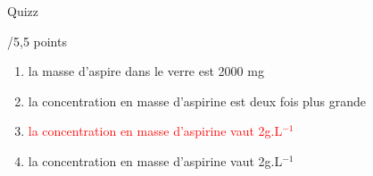 \begin{doc}{Quizz \begin{large}
    /5,5 points
\end{large}}
\begin{enumerate}
\begin{enumerate}[label=\textit{\alph*.}, align=left, leftmargin=*]
            \item la masse d'aspire dans le verre est 2000 mg
            \item la concentration en masse d'aspirine est deux fois plus grande 
            \item \textcolor{red}{la concentration en masse d'aspirine vaut 2g.L$^{-1}$}
            \item la concentration en masse d'aspirine vaut 2g.L$^{-1}$
        \end{enumerate}
\end{enumerate}
\end{doc}

